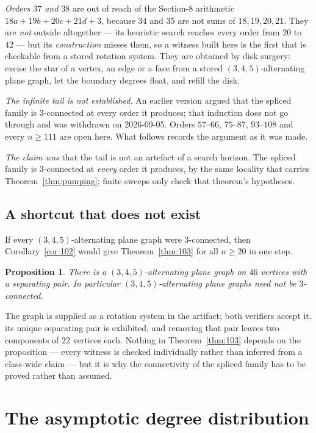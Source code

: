 \documentclass{baustms}
\theoremstyle{cupthm}
\newtheorem{proposition}[theorem]{Proposition}
\theoremstyle{cupdefn}
\theoremstyle{cuprem}
\begin{document}
\emph{Orders $37$ and $38$} are out of reach of the Section-8 arithmetic
$18a+19b+20c+21d+3$, because $34$ and $35$ are not sums of $18,19,20,21$. They
are \emph{not} outside \cite{AHSSV2015} altogether --- its heuristic search
reaches every order from $20$ to $42$ --- but its \emph{construction} misses
them, so a witness built here is the first that is checkable from a stored
rotation system. They are obtained by
disk surgery: excise the star of a vertex, an edge or a face from a stored
$(3,4,5)$-alternating plane graph, let the boundary degrees float, and refill
the disk.

\emph{The infinite tail is not established.} An earlier version argued that the
spliced family is $3$-connected at every order it produces; that induction does
not go through and was withdrawn on 2026-09-05. Orders $57$--$66$, $75$--$87$,
$93$--$108$ and every $n \ge 111$ are open here. What follows records the
argument as it was made.

\emph{The claim was} that the tail is not an artefact of a search horizon. The spliced
family is $3$-connected at \emph{every} order it produces, by the same locality
that carries Theorem~\ref{thm:pumping}; finite sweeps only check that theorem's
hypotheses.

\subsection{A shortcut that does not exist}

If every $(3,4,5)$-alternating plane graph were $3$-connected, then
Corollary~\ref{cor:102} would give Theorem~\ref{thm:103} for all $n \ge 20$ in
one step.

\begin{proposition}\label{prop:not3conn}
There is a $(3,4,5)$-alternating plane graph on $46$ vertices with a separating
pair. In particular $(3,4,5)$-alternating plane graphs need not be
$3$-connected.
\end{proposition}

The graph is supplied as a rotation system in the artifact; both verifiers
accept it, its unique separating pair is exhibited, and removing that pair
leaves two components of $22$ vertices each. Nothing in
Theorem~\ref{thm:103} depends on the proposition --- every witness is checked
individually rather than inferred from a class-wide claim --- but it is why the
connectivity of the spliced family has to be proved rather than assumed.

\section{The asymptotic degree distribution}\label{sec:density}
\end{document}
